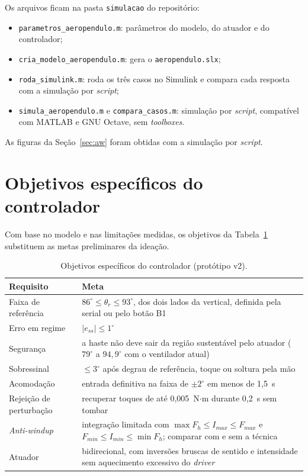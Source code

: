 \documentclass[a4paper,11pt]{article}
\begin{document}
Os arquivos ficam na pasta \texttt{simulacao} do repositório:
\begin{itemize}
  \item \texttt{parametros\_aeropendulo.m}: parâmetros do modelo, do atuador e do controlador;
  \item \texttt{cria\_modelo\_aeropendulo.m}: gera o \texttt{aeropendulo.slx};
  \item \texttt{roda\_simulink.m}: roda os três casos no Simulink e compara cada resposta com a
    simulação por \textit{script};
  \item \texttt{simula\_aeropendulo.m} e \texttt{compara\_casos.m}: simulação por \textit{script},
    compatível com MATLAB e GNU Octave, sem \textit{toolboxes}.
\end{itemize}
As figuras da Seção~\ref{sec:aw} foram obtidas com a simulação por \textit{script}.

\section{Objetivos específicos do controlador}
\label{sec:objetivos}

Com base no modelo e nas limitações medidas, os objetivos da Tabela~\ref{tab:objetivos} substituem
as metas preliminares da ideação.

\begin{table}[H]
\centering\small
\caption{Objetivos específicos do controlador (protótipo v2).}
\label{tab:objetivos}
\begin{tabularx}{\textwidth}{@{}l>{\raggedright\arraybackslash}X@{}}
\toprule
\textbf{Requisito} & \textbf{Meta} \\
\midrule
Faixa de referência & $86^\circ \le \theta_r \le 93^\circ$, dos dois lados da vertical, definida pela serial ou pelo botão B1 \\
Erro em regime & $|e_{ss}| \le 1^\circ$ \\
Segurança & a haste não deve sair da região sustentável pelo atuador ($79^\circ$ a $94{,}9^\circ$ com o ventilador atual) \\
Sobressinal & $\le 3^\circ$ após degrau de referência, toque ou soltura pela mão \\
Acomodação & entrada definitiva na faixa de $\pm2^\circ$ em menos de 1,5~s \\
Rejeição de perturbação & recuperar toques de até 0,005~N$\cdot$m durante 0,2~s sem tombar \\
\textit{Anti-windup} & integração limitada com $\max F_h \le I_{max} \le F_{max}$ e $F_{min} \le I_{min} \le \min F_h$; comparar com e sem a técnica \\
Atuador & bidirecional, com inversões bruscas de sentido e intensidade sem aquecimento excessivo do \textit{driver} \\
\bottomrule
\end{tabularx}
\end{table}
\end{document}
